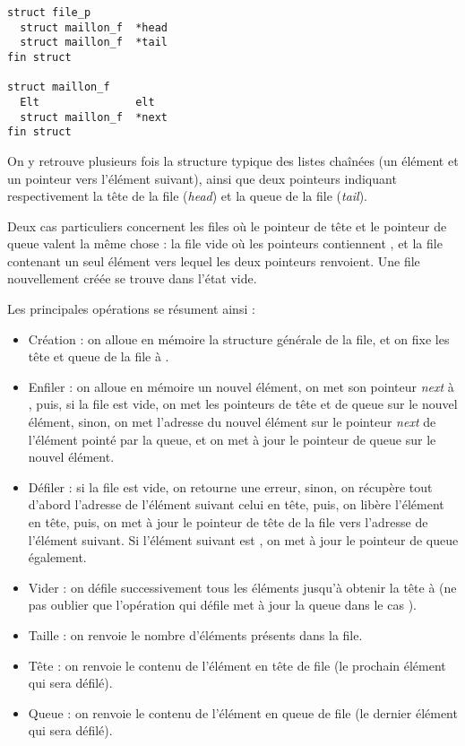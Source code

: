 \documentclass[11pt,a4paper]{article}
\begin{document}
\medskip

\begin{center}
\begin{lstlisting}[style=algorithmique]
struct file_p
  struct maillon_f  *head
  struct maillon_f  *tail
fin struct

struct maillon_f
  Elt               elt
  struct maillon_f  *next
fin struct \end{lstlisting}
\end{center}

On y retrouve plusieurs fois la structure typique des listes chaînées (un élément et un pointeur vers l'élément suivant), ainsi que deux pointeurs indiquant respectivement la tête de la file (\textit{head}) et la queue de la file (\textit{tail}).

Deux cas particuliers concernent les files où le pointeur de tête et le pointeur de queue valent la même chose : la file vide où les pointeurs contiennent , et la file contenant un seul élément vers lequel les deux pointeurs renvoient.
Une file nouvellement créée se trouve dans l'état vide.\\

\medskip



Les principales opérations se résument ainsi :
\begin{itemize}
\item Création : on alloue en mémoire la structure générale de la file, et on fixe les tête et queue de la file à .
\item Enfiler : on alloue en mémoire un nouvel élément, on met son pointeur \textit{next} à , puis, si la file est vide, on met les pointeurs de tête et de queue sur le nouvel élément, sinon, on met l'adresse du nouvel élément sur le pointeur \textit{next} de l'élément pointé par la queue, et on met à jour le pointeur de queue sur le nouvel élément.
\item Défiler : si la file est vide, on retourne une erreur, sinon, on récupère tout d'abord l'adresse de l'élément suivant celui en tête, puis, on libère l'élément en tête, puis, on met à jour le pointeur de tête de la file vers l'adresse de l'élément suivant. Si l'élément suivant est , on met à jour le pointeur de queue également.
\item Vider : on défile successivement tous les éléments jusqu'à obtenir la tête à  (ne pas oublier que l'opération qui défile met à jour la queue dans le cas ).
\item Taille : on renvoie le nombre d'éléments présents dans la file.
\item Tête : on renvoie le contenu de l'élément en tête de file (le prochain élément qui sera défilé).
\item Queue : on renvoie le contenu de l'élément en queue de file (le dernier élément qui sera défilé).
\end{itemize}
\end{document}
